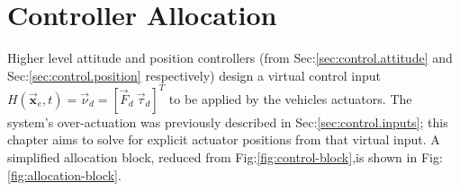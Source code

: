\chapter{Controller Allocation}
\label{ch:allocation}
Higher level attitude and position controllers (from Sec:\ref{sec:control.attitude} and Sec:\ref{sec:control.position} respectively) design a virtual control input $H(\vec{\mathbf{x}}_e,t)=\vec{\nu}_d=[\vec{F}_d~\vec{\tau}_d]^T$ to be applied by the vehicles actuators. The system's over-actuation was previously described in Sec:\ref{sec:control.inputs}; this chapter aims to solve for explicit actuator positions from that virtual input. A simplified allocation block, reduced from Fig:\ref{fig:control-block},is shown in Fig:\ref{fig:allocation-block}.
